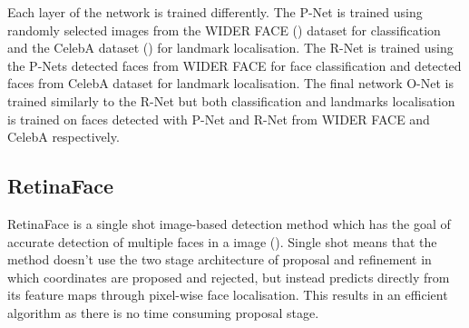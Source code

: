 \documentclass{l4proj}
\begin{document}
Each layer of the network is trained differently. The P-Net is trained using randomly selected images from the WIDER FACE (\cite{widerface}) dataset for classification and the CelebA dataset (\cite{celeba}) for landmark localisation. The R-Net is trained using the P-Nets detected faces from WIDER FACE for face classification and detected faces from CelebA dataset for landmark localisation. The final network O-Net is trained similarly to the R-Net but both classification and landmarks localisation is trained on faces detected with P-Net and R-Net from WIDER FACE and CelebA respectively. 

\subsection{RetinaFace}
\label{retinaface}
RetinaFace is a single shot image-based detection method which has the goal of accurate detection of multiple faces in a image (\cite{retinaface}). Single shot means that the method doesn't use the two stage architecture of proposal and refinement in which coordinates are proposed and rejected, but instead predicts directly from its feature maps through pixel-wise face localisation. This results in an efficient algorithm as there is no time consuming proposal stage.
\end{document}

